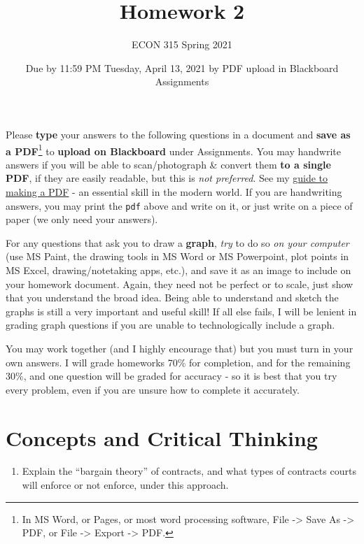 \documentclass[
  11pt,
]{article}
\title{Homework 2}
\author{ECON 315 Spring 2021}
\date{Due by 11:59 PM Tuesday, April 13, 2021 by PDF upload in
Blackboard Assignments}
\providecommand{\tightlist}{%
  \setlength{\itemsep}{0pt}\setlength{\parskip}{0pt}}
\begin{document}
\maketitle

Please \textbf{type} your answers to the following questions in a
document and \textbf{save as a PDF}\footnote{In MS Word, or Pages, or
  most word processing software, File -\textgreater{} Save As
  -\textgreater{} PDF, or File -\textgreater{} Export -\textgreater{}
  PDF.} to \textbf{upload on Blackboard} under Assignments. You may
handwrite answers if you will be able to scan/photograph \& convert them
\textbf{to a single PDF}, if they are easily readable, but this is
\emph{not preferred}. See my
\href{/resources/\#how-to-make-a-pdf-for-submitting-assignments}{guide
to making a PDF} - an essential skill in the modern world. If you are
handwriting answers, you may print the \texttt{pdf} above and write on
it, or just write on a piece of paper (we only need your answers).

For any questions that ask you to draw a \textbf{graph}, \emph{try} to
do so \emph{on your computer} (use MS Paint, the drawing tools in MS
Word or MS Powerpoint, plot points in MS Excel, drawing/notetaking apps,
etc.), and save it as an image to include on your homework document.
Again, they need not be perfect or to scale, just show that you
understand the broad idea. Being able to understand and sketch the
graphs is still a very important and useful skill! If all else fails, I
will be lenient in grading graph questions if you are unable to
technologically include a graph.

You may work together (and I highly encourage that) but you must turn in
your own answers. I will grade homeworks 70\% for completion, and for
the remaining 30\%, and one question will be graded for accuracy - so it
is best that you try every problem, even if you are unsure how to
complete it accurately.

\clearpage

\hypertarget{concepts-and-critical-thinking}{%
\section{Concepts and Critical
Thinking}\label{concepts-and-critical-thinking}}

\begin{enumerate}
\def\labelenumi{\arabic{enumi}.}
\tightlist
\item
  Explain the ``bargain theory'' of contracts, and what types of
  contracts courts will enforce or not enforce, under this approach.
\end{enumerate}
\end{document}
